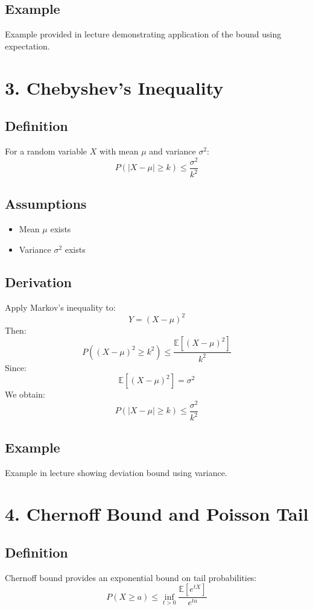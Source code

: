 \documentclass[12pt]{article}
\begin{document}
\subsection*{Example}
Example provided in lecture demonstrating application of the bound using expectation.

\section*{3. Chebyshev's Inequality}

\subsection*{Definition}
For a random variable $X$ with mean $\mu$ and variance $\sigma^2$:
\[
P(|X - \mu| \geq k) \leq \frac{\sigma^2}{k^2}
\]

\subsection*{Assumptions}
\begin{itemize}
    \item Mean $\mu$ exists
    \item Variance $\sigma^2$ exists
\end{itemize}

\subsection*{Derivation}
Apply Markov's inequality to:
\[
Y = (X - \mu)^2
\]
Then:
\[
P((X - \mu)^2 \geq k^2) \leq \frac{\mathbb{E}[(X - \mu)^2]}{k^2}
\]
Since:
\[
\mathbb{E}[(X - \mu)^2] = \sigma^2
\]
We obtain:
\[
P(|X - \mu| \geq k) \leq \frac{\sigma^2}{k^2}
\]

\subsection*{Example}
Example in lecture showing deviation bound using variance.

\section*{4. Chernoff Bound and Poisson Tail}

\subsection*{Definition}
Chernoff bound provides an exponential bound on tail probabilities:
\[
P(X \geq a) \leq \inf_{t > 0} \frac{\mathbb{E}[e^{tX}]}{e^{ta}}
\]
\end{document}
